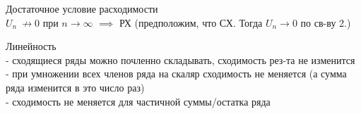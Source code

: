 \par
\begin{sv}
    Достаточное условие расходимости\\
    \(U_n\ \not\to 0\) при \(n\to\infty\) \(\implies\) РХ (предположим, что СХ. Тогда $U_n\to 0$ по св-ву 2.)

\end{sv}
\par
\begin{sv}
    Линейность\\
    - сходящиеся ряды можно почленно складывать, сходимость рез-та не изменится\\
    - при умножении всех членов ряда на скаляр сходимость не меняется (а сумма ряда изменится в это число раз)\\
    - сходимость не меняется для частичной суммы/остатка ряда
\end{sv}





